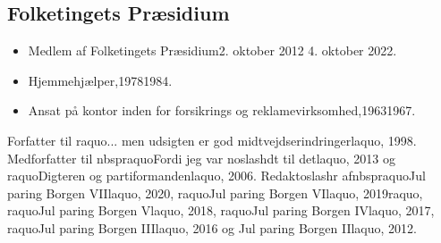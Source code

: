\documentclass[11pt, a4paper]{awesome-cv}
\begin{document}
\begin{cvletter}
\subsection*{Folketingets Præsidium}
\begin{itemize}
\item Medlem af Folketingets Præsidium2. oktober 2012  4. oktober 2022.
\end{itemize}
\begin{itemize}
\item Hjemmehjælper,19781984.
\item Ansat på kontor inden for forsikrings og reklamevirksomhed,19631967.
\end{itemize}
Forfatter til raquo... men udsigten er god  midtvejdserindringerlaquo, 1998. Medforfatter til nbspraquoFordi jeg var noslashdt til detlaquo, 2013 og raquoDigteren og partiformandenlaquo, 2006. Redaktoslashr afnbspraquoJul paring Borgen VIIlaquo, 2020, raquoJul paring Borgen VIlaquo, 2019raquo, raquoJul paring Borgen Vlaquo, 2018, raquoJul paring Borgen IVlaquo, 2017, raquoJul paring Borgen IIIlaquo, 2016 og Jul paring Borgen IIlaquo, 2012.

\end{cvletter}
\end{document}
